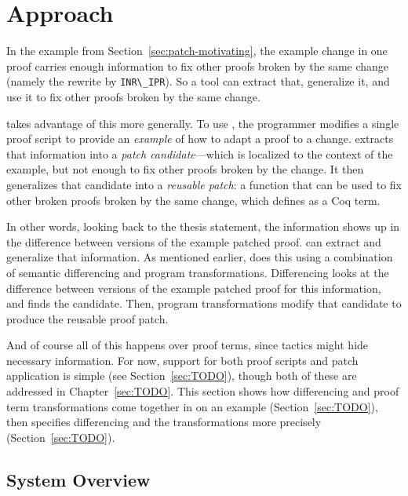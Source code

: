 \section{Approach}

In the example from Section~\ref{sec:patch-motivating}, the example change in one proof carries enough information
to fix other proofs broken by the same change (namely the rewrite by \lstinline{INR\_IPR}).
So a tool can extract that, generalize it, and use it to fix other proofs broken by the same change.

\sysname takes advantage of this more generally.
To use \sysname, the programmer modifies a single proof script to provide an \textit{example} of how to adapt a proof to a change.
\sysname extracts that information into a \textit{patch candidate}---which is localized to the context of the example, but not enough to fix other proofs broken by the change.
It then generalizes that candidate into a \textit{reusable patch}: a function
that can be used to fix other broken proofs broken by the same change, which \sysname defines as a Coq term.

In other words, looking back to the thesis statement, the information shows up in the difference between versions of the example patched proof.
\sysname can extract and generalize that information.
As mentioned earlier, \sysname does this using a combination of semantic differencing and program transformations.
Differencing looks at the difference between versions of the example patched proof for this information, and finds the candidate.
Then, program transformations modify that candidate to produce the reusable proof patch.

And of course all of this happens over proof terms, since tactics might hide necessary information.
For now, support for both proof scripts and patch application is simple (see Section~\ref{sec:TODO}), though both of these are addressed in Chapter~\ref{sec:TODO}.
This section shows how differencing and proof term transformations come together in \sysname on an example (Section~\ref{sec:TODO}),
then specifies differencing and the transformations more precisely (Section~\ref{sec:TODO}).

\subsection{System Overview}
\label{sec:pumpkin-overview}


